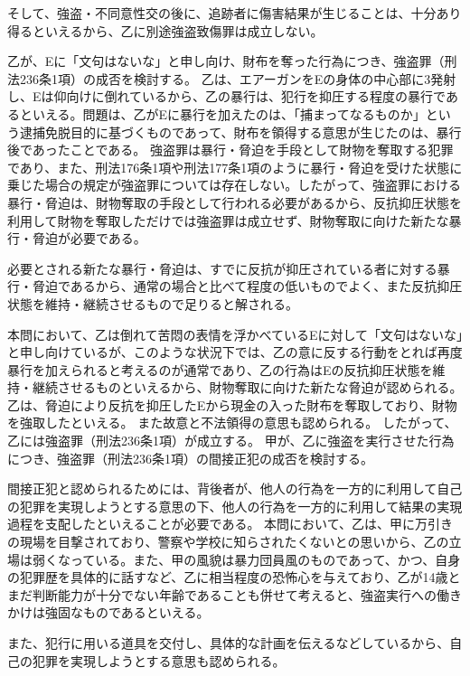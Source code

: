 \documentclass[11pt]{jsarticle}
\begin{document}
		そして、強盗・不同意性交の後に、追跡者に傷害結果が生じることは、十分あり得るといえるから、乙に別途強盗致傷罪は成立しない。

	\sectionB{}
		乙が、Eに「文句はないな」と申し向け、財布を奪った行為につき、強盗罪（刑法236条1項）の成否を検討する。
		\sectionC{}
			乙は、エアーガンをEの身体の中心部に3発射し、Eは仰向けに倒れているから、乙の暴行は、犯行を抑圧する程度の暴行であるといえる。問題は、乙がEに暴行を加えたのは、「捕まってなるものか」という逮捕免脱目的に基づくものであって、財布を領得する意思が生じたのは、暴行後であったことである。
			\sectionD{}
				強盗罪は暴行・脅迫を手段として財物を奪取する犯罪であり、また、刑法176条1項や刑法177条1項のように暴行・脅迫を受けた状態に乗じた場合の規定が強盗罪については存在しない。したがって、強盗罪における暴行・脅迫は、財物奪取の手段として行われる必要があるから、反抗抑圧状態を利用して財物を奪取しただけでは強盗罪は成立せず、財物奪取に向けた新たな暴行・脅迫が必要である。
				
				必要とされる新たな暴行・脅迫は、すでに反抗が抑圧されている者に対する暴行・脅迫であるから、通常の場合と比べて程度の低いものでよく、また反抗抑圧状態を維持・継続させるもので足りると解される。
				
				本問において、乙は倒れて苦悶の表情を浮かべているEに対して「文句はないな」と申し向けているが、このような状況下では、乙の意に反する行動をとれば再度暴行を加えられると考えるのが通常であり、乙の行為はEの反抗抑圧状態を維持・継続させるものといえるから、財物奪取に向けた新たな脅迫が認められる。
			\sectionD{}
				乙は、脅迫により反抗を抑圧したEから現金の入った財布を奪取しており、財物を強取したといえる。
			\sectionD{}
				また故意と不法領得の意思も認められる。
		\sectionC{}
			したがって、乙には強盗罪（刑法236条1項）が成立する。
	\sectionB{}
		甲が、乙に強盗を実行させた行為につき、強盗罪（刑法236条1項）の間接正犯の成否を検討する。
		
		\sectionC{}
			間接正犯と認められるためには、背後者が、他人の行為を一方的に利用して自己の犯罪を実現しようとする意思の下、他人の行為を一方的に利用して結果の実現過程を支配したといえることが必要である。
		\sectionC{}
			本問において、乙は、甲に万引きの現場を目撃されており、警察や学校に知らされたくないとの思いから、乙の立場は弱くなっている。また、甲の風貌は暴力団員風のものであって、かつ、自身の犯罪歴を具体的に話すなど、乙に相当程度の恐怖心を与えており、乙が14歳とまだ判断能力が十分でない年齢であることも併せて考えると、強盗実行への働きかけは強固なものであるといえる。
			
			また、犯行に用いる道具を交付し、具体的な計画を伝えるなどしているから、自己の犯罪を実現しようとする意思も認められる。
			
\end{document}
